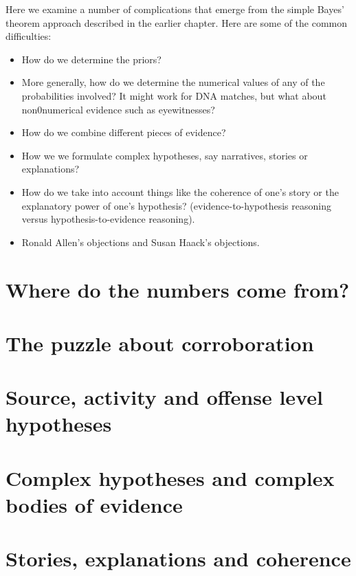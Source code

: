 \documentclass[]{book}
\begin{document}
Here we examine a number of complications that emerge from the simple
Bayes' theorem approach described in the earlier chapter. Here are some
of the common difficulties:

\begin{itemize}
 
 \item How do we determine the priors?
 
 \item More generally, how do we determine the numerical 
 values of any of the probabilities involved? 
 It might work for DNA matches, but what about non0numerical evidence 
 such as eyewitnesses? 
 
 \item How do we combine different pieces of evidence?  
 
 \item How we we formulate complex hypotheses, 
 say narratives, stories or explanations? 
 
 \item How do we take into account things 
 like the coherence of one's story or 
 the explanatory power of one's hypothesis?
 (evidence-to-hypothesis reasoning 
 versus hypothesis-to-evidence reasoning).
 
 \item Ronald Allen's objections 
 and Susan Haack's objections. 
 
 \end{itemize}

\section{Where do the numbers come from?}

\section{The puzzle about corroboration}

\section{Source, activity and offense level hypotheses}

\section{Complex hypotheses and complex bodies of evidence}

\section{Stories, explanations and coherence}
\end{document}
